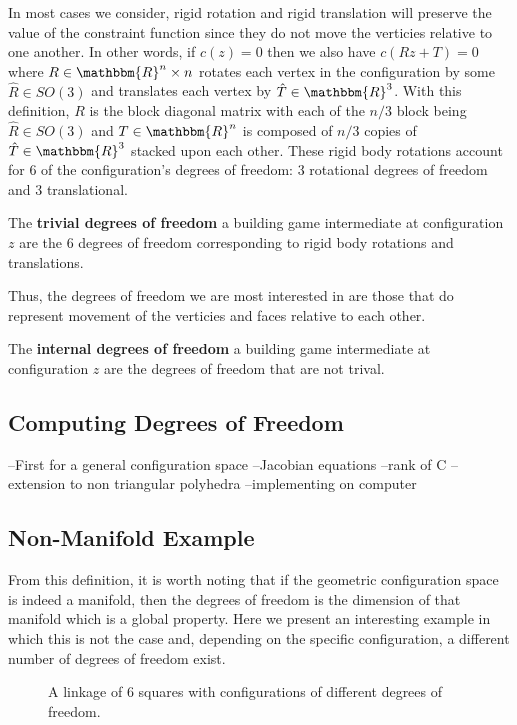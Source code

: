 In most cases we consider, rigid rotation and rigid translation will preserve the value of the constraint function since they do not move the verticies relative to one another. In other words, if $c(z) = 0$ then we also have $c(Rz + T) = 0$ where $R \in \mathbbm{R}^{n}\times n$ rotates each vertex in the configuration by some $\hat{R} \in SO(3)$ and translates each vertex by $\hat{T} \in \mathbbm{R}^3$. With this definition, $R$ is the block diagonal matrix with each of the $n/3$ block being $\hat{R} \in SO(3)$ and $T \in \mathbbm{R}^n$ is composed of $n/3$ copies of $\hat{T} \in \mathbbm{R}^3$ stacked upon each other. These rigid body rotations account for $6$ of the configuration's degrees of freedom: $3$ rotational degrees of freedom and $3$ translational.
\begin{mydef}
The \textbf{trivial degrees of freedom} a building game intermediate at configuration $z$ are the $6$ degrees of freedom corresponding to rigid body rotations and translations.
\end{mydef}
Thus, the degrees of freedom we are most interested in are those that do represent movement of the verticies and faces relative to each other. 
\begin{mydef}
The \textbf{internal degrees of freedom} a building game intermediate at configuration $z$ are the degrees of freedom that are not trival.
\end{mydef}

\subsection{Computing Degrees of Freedom}
--First for a general configuration space
--Jacobian equations
--rank of C
--extension to non triangular polyhedra
--implementing on computer


\subsection{Non-Manifold Example}
From this definition, it is worth noting that if the geometric configuration space is indeed a manifold, then the degrees of freedom is the dimension of that manifold which is a global property. Here we present an interesting example in which this is not the case and, depending on the specific configuration, a different number of degrees of freedom exist.

\begin{figure}[ht]
\caption{A linkage of 6 squares with configurations of different degrees of freedom.}
\label{fig:SixSq}
\end{figure}


